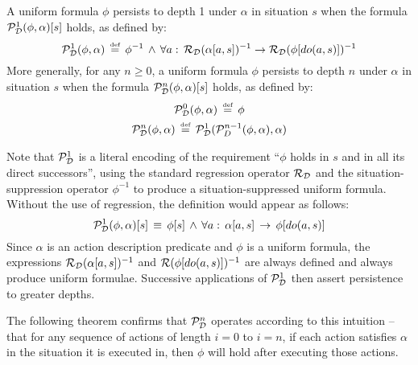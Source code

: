 \begin{defnL}
 A uniform formula $\phi$ persists
to depth 1 under $\alpha$ in situation $s$ when the formula $\mathcal{P}_{\mathcal{D}}^{1}(\phi,\alpha)[s]$
holds, as defined by:\label{def:persists-depth-n}\[
\mathcal{P}_{\mathcal{D}}^{1}(\phi,\alpha)\,\stackrel{\mbox{\tiny def}}{=}\,\phi^{-1}\,\wedge\,\forall a:\,\mathcal{R}_{\mathcal{D}}(\alpha[a,s])^{-1}\rightarrow\mathcal{R}_{\mathcal{D}}(\phi[do(a,s)])^{-1}\]
 More generally, for any $n\geq0$, a uniform formula $\phi$ persists
to depth $n$ under $\alpha$ in situation $s$ when the formula $\mathcal{P}_{\mathcal{D}}^{n}(\phi,\alpha)[s]$
holds, as defined by:\begin{gather*}
\mathcal{P}_{\mathcal{D}}^{0}(\phi,\alpha)\,\stackrel{\mbox{\tiny def}}{=}\,\phi\\
\mathcal{P}_{\mathcal{D}}^{n}(\phi,\alpha)\,\stackrel{\mbox{\tiny def}}{=}\,\mathcal{P}_{\mathcal{D}}^{1}(\mathcal{P}_{D}^{n-1}(\phi,\alpha),\alpha)\end{gather*}

\end{defnL}
Note that $\mathcal{P}_{\mathcal{D}}^{1}$ is a literal encoding of the requirement
{}``$\phi$ holds in $s$ and in all its direct successors'', using
the standard regression operator $\mathcal{R}_{\mathcal{D}}$ and the situation-suppression
operator $\phi^{-1}$ to produce a situation-suppressed uniform formula.
Without the use of regression, the definition would appear as follows:\[
\mathcal{P}^{1}_{\mathcal{D}}(\phi,\alpha)[s]\,\equiv\,\phi[s]\,\wedge\,\forall a:\,\alpha[a,s]\,\rightarrow\,\phi[do(a,s)]\]
 Since $\alpha$ is an action description predicate and $\phi$ is
a uniform formula, the expressions $\mathcal{R}_{\mathcal{D}}(\alpha[a,s])^{-1}$
and $\mathcal{R}(\phi[do(a,s)])^{-1}$ are always defined and always produce
uniform formulae. Successive applications of $\mathcal{P}_{\mathcal{D}}^{1}$ then
assert persistence to greater depths.

The following theorem confirms that $\mathcal{P}_{\mathcal{D}}^{n}$ operates according
to this intuition -- that for any sequence of actions of length $i=0$
to $i=n$, if each action satisfies $\alpha$ in the situation it
is executed in, then $\phi$ will hold after executing those actions.

